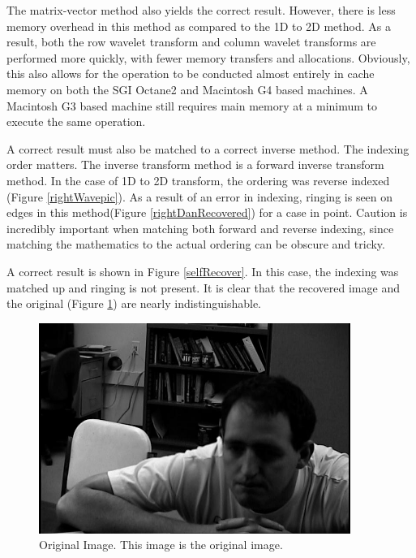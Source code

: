 The matrix-vector method also yields the correct result.  However, there is less memory overhead in this method as compared to the 1D to 2D method.  As a result, both the row wavelet transform and column wavelet transforms are performed more quickly, with fewer memory transfers and allocations.  Obviously, this also allows for the operation to be conducted almost entirely in cache memory on both the SGI Octane2 and Macintosh G4 based machines.  A Macintosh G3 based machine still requires main memory at a minimum to execute the same operation.%

A correct result must also be matched to a correct inverse method.  The indexing order matters.  The inverse transform method is a forward inverse transform method.  In the case of 1D to 2D transform, the ordering was reverse indexed (Figure \ref{rightWavepic}).  As a result of an error in indexing, ringing is seen on edges in this method(Figure \ref{rightDanRecovered}) for a case in point.  Caution is incredibly important when matching both forward and reverse indexing, since matching the mathematics to the actual ordering can be obscure and tricky.   

A correct result is shown in Figure \ref{selfRecover}.  In this case, the indexing was matched up and ringing is not present.  It is clear that the recovered image and the original (Figure \ref{rightDan}) are nearly indistinguishable.  

\begin{figure}[htb]
\begin{center}
\includegraphics [width=4in]{rightDan.jpg}
\end{center}
\caption{Original Image.  This image is the original image. }
\label{rightDan}
\end{figure}

